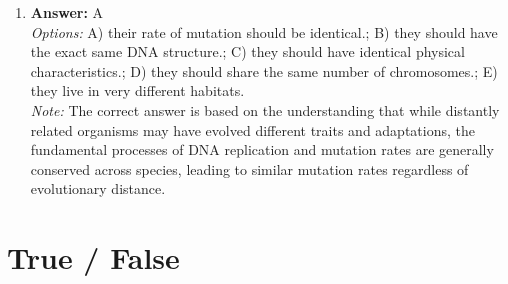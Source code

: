 \documentclass[12pt]{article}
\begin{document}
\begin{enumerate}[label=\arabic*.]
\item \textbf{Answer:} A
\\ \textit{Options:} A) their rate of mutation should be identical.; B) they should have the exact same DNA structure.; C) they should have identical physical characteristics.; D) they should share the same number of chromosomes.; E) they live in very different habitats.
\\ \textit{Note:} The correct answer is based on the understanding that while distantly related organisms may have evolved different traits and adaptations, the fundamental processes of DNA replication and mutation rates are generally conserved across species, leading to similar mutation rates regardless of evolutionary distance.
\end{enumerate}

\section*{True / False}
\end{document}
